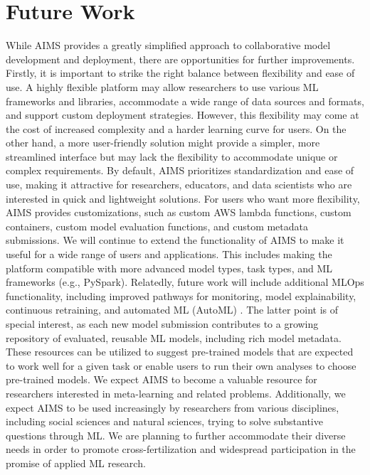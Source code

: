 \section{Future Work}
While AIMS provides a greatly simplified approach to collaborative model development and deployment, there are opportunities for further improvements. Firstly, it is important to strike the right balance between flexibility and ease of use. A highly flexible platform may allow researchers to use various ML frameworks and libraries, accommodate a wide range of data sources and formats, and support custom deployment strategies. However, this flexibility may come at the cost of increased complexity and a harder learning curve for users. On the other hand, a more user-friendly solution might provide a simpler, more streamlined interface but may lack the flexibility to accommodate unique or complex requirements. By default, AIMS prioritizes standardization and ease of use, making it attractive for researchers, educators, and data scientists who are interested in quick and lightweight solutions. For users who want more flexibility, AIMS provides customizations, such as custom AWS lambda functions, custom containers, custom model evaluation functions, and custom metadata submissions. We will continue to extend the functionality of AIMS to make it useful for a wide range of users and applications. This includes making the platform compatible with more advanced model types, task types, and ML frameworks (e.g., PySpark). Relatedly, future work will include additional MLOps functionality, including improved pathways for monitoring, model explainability, continuous retraining, and automated ML (AutoML) \citep{hutter_automated_2019, he_automl_2021}. The latter point is of special interest, as each new model submission contributes to a growing repository of evaluated, reusable ML models, including rich model metadata. These resources can be utilized to suggest pre-trained models that are expected to work well for a given task or enable users to run their own analyses to choose pre-trained models. We expect AIMS to become a valuable resource for researchers interested in meta-learning \citep{hospedales_meta-learning_2020, finn_model-agnostic_2017} and related problems. Additionally, we expect AIMS to be used increasingly by researchers from various disciplines, including social sciences and natural sciences, trying to solve substantive questions through ML. We are planning to further accommodate their diverse needs in order to promote cross-fertilization and widespread participation in the promise of applied ML research. 

